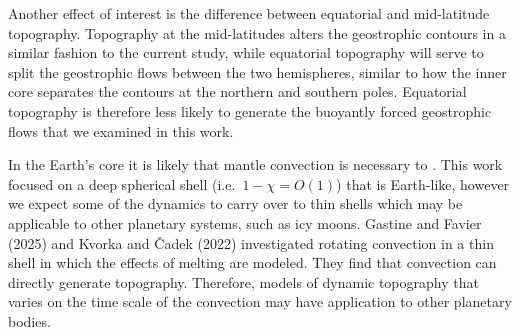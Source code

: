  Another effect of interest is the difference between equatorial and mid-latitude topography. Topography at the mid-latitudes alters the geostrophic contours in a similar fashion to the current study, while equatorial topography will serve to split the geostrophic flows between the two hemispheres, similar to how the inner core separates the contours at the northern and southern poles.
 Equatorial topography is therefore less likely to generate the buoyantly forced geostrophic flows that we examined in this work.
 

 In the Earth's core it is likely that mantle convection is necessary to .
 This work focused on a deep spherical shell (i.e.~$1 - \chi = O(1)$) that is Earth-like, however we expect some of the dynamics to carry over to thin shells which may be applicable to other planetary systems, such as icy moons.
Gastine and Favier (2025) \citep{tG25} and Kvorka and \v{C}adek (2022) \citep{jK22} investigated rotating convection in a thin shell in which the effects of melting are modeled.
They find that convection  can directly generate topography. 
Therefore, models of dynamic topography that varies on the time scale of the convection may have application to other planetary bodies.
